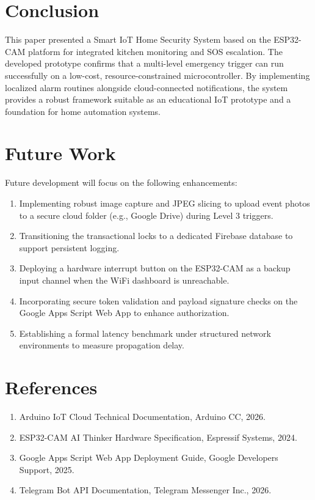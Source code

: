 \documentclass[conference]{IEEEtran}
\begin{document}
\section{Conclusion}
This paper presented a Smart IoT Home Security System based on the ESP32-CAM platform for integrated kitchen monitoring and SOS escalation. The developed prototype confirms that a multi-level emergency trigger can run successfully on a low-cost, resource-constrained microcontroller. By implementing localized alarm routines alongside cloud-connected notifications, the system provides a robust framework suitable as an educational IoT prototype and a foundation for home automation systems.

\section{Future Work}
Future development will focus on the following enhancements:
\begin{enumerate}
    \item Implementing robust image capture and JPEG slicing to upload event photos to a secure cloud folder (e.g., Google Drive) during Level 3 triggers.
    \item Transitioning the transactional locks to a dedicated Firebase database to support persistent logging.
    \item Deploying a hardware interrupt button on the ESP32-CAM as a backup input channel when the WiFi dashboard is unreachable.
    \item Incorporating secure token validation and payload signature checks on the Google Apps Script Web App to enhance authorization.
    \item Establishing a formal latency benchmark under structured network environments to measure propagation delay.
\end{enumerate}

\section*{References}
\begin{enumerate}
    \item Arduino IoT Cloud Technical Documentation, Arduino CC, 2026.
    \item ESP32-CAM AI Thinker Hardware Specification, Espressif Systems, 2024.
    \item Google Apps Script Web App Deployment Guide, Google Developers Support, 2025.
    \item Telegram Bot API Documentation, Telegram Messenger Inc., 2026.
\end{enumerate}
\end{document}
